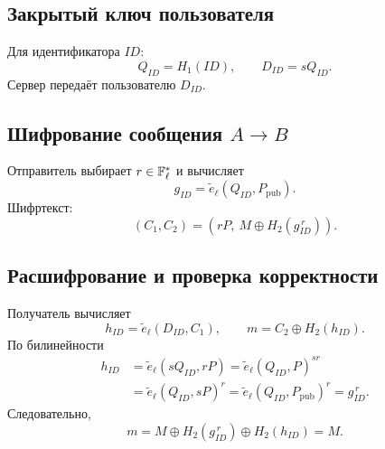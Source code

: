 \documentclass[12pt,a4paper]{article}
\begin{document}
\subsection*{Закрытый ключ пользователя}
Для идентификатора $ID$:
\[Q_{ID}=H_1(ID),\qquad D_{ID}=sQ_{ID}.\]
Сервер передаёт пользователю $D_{ID}$.

\subsection*{Шифрование сообщения $A\to B$}
Отправитель выбирает $r\in\mathbb F_\ell^*$ и вычисляет
\[g_{ID}=\widetilde e_\ell(Q_{ID},P_{\mathrm{pub}}).\]
Шифртекст:
\[(C_1,C_2)=\left(rP,\ M\oplus H_2(g_{ID}^{\,r})\right).\]

\subsection*{Расшифрование и проверка корректности}
Получатель вычисляет
\[h_{ID}=\widetilde e_\ell(D_{ID},C_1),\qquad m=C_2\oplus H_2(h_{ID}).\]
По билинейности
\begin{align*}
h_{ID}
&=\widetilde e_\ell(sQ_{ID},rP)
=\widetilde e_\ell(Q_{ID},P)^{sr}\\
&=\widetilde e_\ell(Q_{ID},sP)^r
=\widetilde e_\ell(Q_{ID},P_{\mathrm{pub}})^r
=g_{ID}^{\,r}.
\end{align*}
Следовательно,
\[m=M\oplus H_2(g_{ID}^{\,r})\oplus H_2(h_{ID})=M.\]
\end{document}
